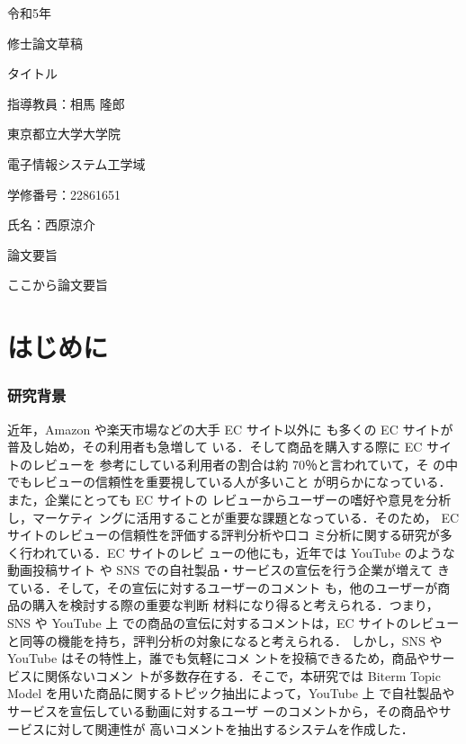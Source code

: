 \documentclass{ltjarticle}
\begin{document}
\begin{titlepage}
    \begin{center}
        {\Large 令和5年}
        \vspace{10truept}

        {\Large 修士論文草稿}
        \vspace*{180truept}

        {\Huge タイトル} 
        \vspace{160truept}

        {\Large 指導教員：相馬 隆郎}
        \vspace{30truept}

        {\Large 東京都立大学大学院}
        \vspace{10truept}

        {\Large 電子情報システム工学域}
        \vspace{30truept}

        {\Large 学修番号：22861651}
        \vspace{10truept}
        
        {\Large 氏名：西原涼介}
    \end{center}
\end{titlepage}
\noindent
{\LARGE 論文要旨}
\vspace{20truept}

ここから論文要旨

\newpage
\tableofcontents
\clearpage

\part{はじめに}
\section{研究背景}
近年，Amazon や楽天市場などの大手 EC サイト以外に
も多くの EC サイトが普及し始め，その利用者も急増して
いる．そして商品を購入する際に EC サイトのレビューを
参考にしている利用者の割合は約 70％と言われていて，そ
の中でもレビューの信頼性を重要視している人が多いこと
が明らかになっている．また，企業にとっても EC サイトの
レビューからユーザーの嗜好や意見を分析し，マーケティ
ングに活用することが重要な課題となっている．そのため，
EC サイトのレビューの信頼性を評価する評判分析や口コ
ミ分析に関する研究が多く行われている．EC サイトのレビ
ューの他にも，近年では YouTube のような動画投稿サイト
や SNS での自社製品・サービスの宣伝を行う企業が増えて
きている．そして，その宣伝に対するユーザーのコメント
も，他のユーザーが商品の購入を検討する際の重要な判断
材料になり得ると考えられる．つまり，SNS や YouTube 上
での商品の宣伝に対するコメントは，EC サイトのレビュー
と同等の機能を持ち，評判分析の対象になると考えられる．
しかし，SNS や YouTube はその特性上，誰でも気軽にコメ
ントを投稿できるため，商品やサービスに関係ないコメン
トが多数存在する．そこで，本研究では Biterm Topic Model
を用いた商品に関するトピック抽出によって，YouTube 上
で自社製品やサービスを宣伝している動画に対するユーザ
ーのコメントから，その商品やサービスに対して関連性が
高いコメントを抽出するシステムを作成した．
\end{document}
